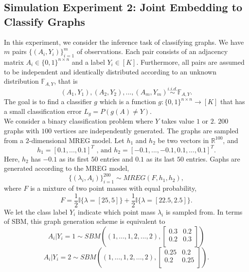 \documentclass[10pt,journal,compsoc]{IEEEtran}
\begin{document}
\subsection{Simulation Experiment 2: Joint Embedding to Classify Graphs}
In this experiment, we consider the inference task of classifying graphs.  We have $m$ pairs $\{(A_i,Y_i)\}_{i=1}^{m}$ of observations. Each pair consists of an adjacency matrix $A_i \in \{0,1\}^{n \times n}$ and a label $Y_i \in [K]$. Furthermore, all pairs are assumed to be independent and identically distributed according to an unknown distribution $\mathbb{F}_{A,Y}$, that is
\[(A_1,Y_1),(A_2,Y_2),...,(A_m,Y_m) \overset{i.i.d.}{\sim} \mathbb{F}_{A,Y}. \] 
The goal is to find a classifier $g$ which is a function $g:\{0,1\}^{n \times n} \rightarrow [K]$ that has a small classification error $L_g=P(g(A)\neq Y)$. \\ 

\noindent We consider a binary classification problem where $Y$ takes value $1$ or $2$. $200$ graphs with $100$ vertices are independently generated. The graphs are sampled from a $2$-dimensional MREG model. Let $h_1$ and $h_2$ be two vectors in $\mathbb{R}^{100}$, and \[h_1=[0.1,...,0.1]^T \text{ , and } h_2=[-0.1,...,-0.1,0.1,...,0.1]^T. \] 
Here, $h_2$ has $-0.1$ as its first $50$ entries and $0.1$ as its last $50$ entries. Gaphs are generated according to the MREG model, 
\begin{equation}
\{(\lambda_i,A_i)\}_{i=1}^{200} \sim MREG(F,h_1,h_2),
\label{eq:simu}
\end{equation}
where $F$ is a mixture of two point masses with equal probability, 
\[ F = \frac{1}{2}\mathbb{I} \{\lambda=[25,5]\} + \frac{1}{2}\mathbb{I} \{\lambda=[22.5,2.5]\}.\]
We let the class label $Y_i$ indicate which point mass $\lambda_i$ is sampled from. In terms of SBM, this graph generation scheme is equivalent to 
\[ A_i|Y_i=1 \sim  SBM((1,...,1,2,...,2),\begin{bmatrix} 0.3 & 0.2 \\ 0.2 & 0.3 \\ \end{bmatrix})  \]
\[ A_i|Y_i=2 \sim  SBM((1,...,1,2,...,2),\begin{bmatrix} 0.25 & 0.2 \\ 0.2 & 0.25 \\ \end{bmatrix}).\]
\end{document}
